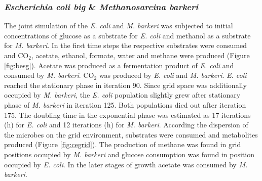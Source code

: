\subsubsection{\textit{Escherichia coli big} \& \textit{Methanosarcina barkeri}}
The joint simulation of the \textit{E. coli} and \textit{M. barkeri} was subjected to initial concentrations of glucose as a substrate for \textit{E. coli} and methanol as a substrate for \textit{M. barkeri}. In the first time steps the respective substrates were consumed and CO$_2$, acetate, ethanol, formate, water and methane were produced (Figure \hyperref[fig:besg]{\ref{fig:besg}}). Acetate was produced as a fermentation product of \textit{E. coli} and consumed by \textit{M. barkeri}. CO$_2$ was produced by \textit{E. coli} and \textit{M. barkeri}. \textit{E. coli} reached the stationary phase in iteration 90.
Since grid space was additionally occupied by \textit{M. barkeri}, the \textit{E. coli} population slightly grew after stationary phase of \textit{M. barkeri} in iteration 125. Both populations died out after iteration 175.
The doubling time in the exponential phase was estimated as 17 iterations (h) for \textit{E. coli} and 12 iterations (h) for \textit{M. barkeri}.
According the dispersion of the microbes on the grid environment, substrates were consumed and metabolites produced (Figure \hyperref[fig:cegrid]{\ref{fig:cegrid}}). The production of methane was found in grid positions occupied by \textit{M. barkeri} and glucose consumption was found in position occupied by \textit{E. coli}. In the later stages of growth acetate was consumed by \textit{M. barkeri}.
